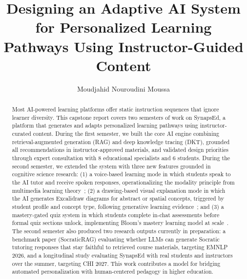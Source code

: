 \documentclass{stylefiles/capstone}
\begin{document}
\title{Designing an Adaptive AI System for Personalized Learning Pathways Using Instructor-Guided Content}


\author{Moudjahid Nouroudini Moussa}


\renewcommand{\shortauthors}{Moudjahid}

\begin{abstract}
Most AI-powered learning platforms offer static instruction sequences that ignore learner diversity. This capstone report covers two semesters of work on SynapsEd, a platform that generates and adapts personalized learning pathways using instructor-curated content. During the first semester, we built the core AI engine combining retrieval-augmented generation (RAG) and deep knowledge tracing (DKT), grounded all recommendations in instructor-approved materials, and validated design priorities through expert consultation with 8 educational specialists and 6 students. During the second semester, we extended the system with three new features grounded in cognitive science research: (1) a voice-based learning mode in which students speak to the AI tutor and receive spoken responses, operationalizing the modality principle from multimedia learning theory~\cite{mayer2021instructional,moreno2007interactive}; (2) a drawing-based visual explanation mode in which the AI generates Excalidraw diagrams for abstract or spatial concepts, triggered by student profile and concept type, following generative learning evidence~\cite{fiorella2016generative,rau2017visual}; and (3) a mastery-gated quiz system in which students complete in-chat assessments before formal quiz sections unlock, implementing Bloom's mastery learning model at scale~\cite{bloom1984sigma}. The second semester also produced two research outputs currently in preparation: a benchmark paper (SocraticRAG) evaluating whether LLMs can generate Socratic tutoring responses that stay faithful to retrieved course materials, targeting EMNLP 2026, and a longitudinal study evaluating SynapsEd with real students and instructors over the summer, targeting CHI 2027. This work contributes a model for bridging automated personalization with human-centered pedagogy in higher education.
\end{abstract}
\end{document}
